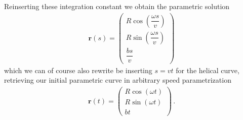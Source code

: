 \documentclass[11pt, DINA4, fleqn]{amsart}
\def\vr{\boldsymbol{r}\xspace}
\begin{document}
Reinserting these integration constant we obtain the parametric solution
\begin{align}
\vr(s) = \begin{pmatrix}
R\cos\left(\dfrac{\omega s}{v}\right) \\
R\sin\left(\dfrac{\omega s}{v}\right) \\
\dfrac{bs}{v}
\end{pmatrix}
\end{align}
which we can of course also rewrite be inserting $s = vt$ for the helical curve,
retrieving our initial parametric curve in arbitrary speed parametrization
\begin{align}
\vr(t) = \begin{pmatrix}
R\cos\left(\omega t\right) \\
R\sin\left(\omega t\right) \\
bt
\end{pmatrix} \, .
\end{align}
\end{document}
